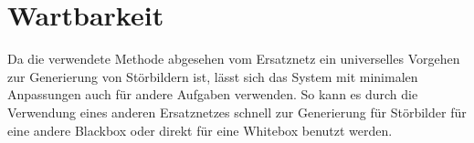 \section{Wartbarkeit}

Da die verwendete Methode abgesehen vom Ersatznetz ein universelles Vorgehen zur Generierung von Störbildern ist, lässt sich das System mit minimalen Anpassungen auch für andere Aufgaben verwenden. So kann es durch die Verwendung eines anderen Ersatznetzes schnell zur Generierung für Störbilder für eine andere Blackbox oder direkt für eine Whitebox benutzt werden. 